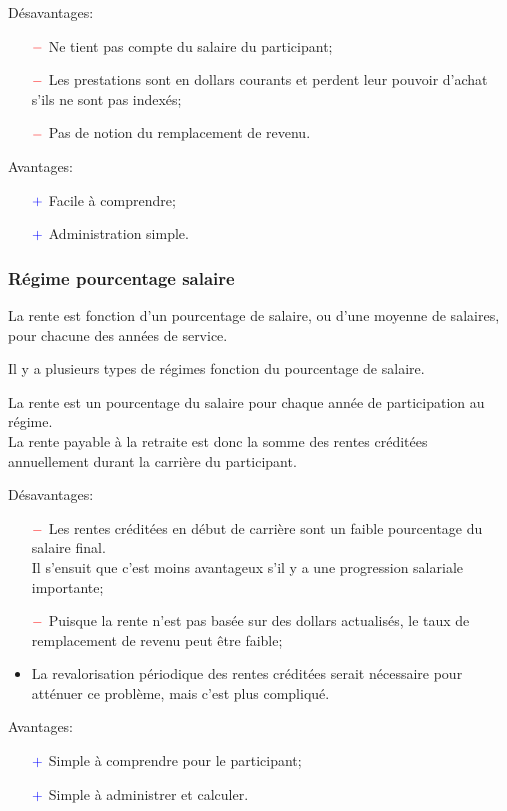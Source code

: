 \documentclass[10pt, french]{article}
\begin{document}
\begin{multicols*}{3}
\begin{definitionNOHFILL}
Désavantages:
\begin{itemize}
	\item[$\color{red}-$]	Ne tient pas compte du salaire du participant;
	\item[$\color{red}-$]	Les prestations sont en dollars courants et perdent leur pouvoir d'achat s'ils ne sont pas indexés;
	\item[$\color{red}-$]	Pas de notion du remplacement de revenu.
\end{itemize}

Avantages:
\begin{itemize}
	\item[$\color{blue}+$]	Facile à comprendre;
	\item[$\color{blue}+$]	Administration simple.
\end{itemize}
\end{definitionNOHFILL}

\subsubsection*{Régime pourcentage salaire}
La rente est fonction d'un pourcentage de salaire, ou d'une moyenne de salaires, pour chacune des années de service.

Il y a plusieurs types de régimes fonction du pourcentage de salaire.

\begin{definitionNOHFILL}
La rente est un pourcentage du salaire pour chaque année de participation au régime. \\
La rente payable à la retraite est donc la somme des rentes créditées annuellement durant la carrière du participant.

Désavantages:
\begin{itemize}
	\item[$\color{red}-$]	Les rentes créditées en début de carrière sont un faible pourcentage du salaire final.\\
							Il s'ensuit que c'est moins avantageux s'il y a une progression salariale importante;
	\item[$\color{red}-$]	Puisque la rente n'est pas basée sur des dollars actualisés, le taux de remplacement de revenu peut être faible;
	\item	La revalorisation périodique des rentes créditées serait nécessaire pour atténuer ce problème, mais c'est plus compliqué.
\end{itemize}

Avantages:
\begin{itemize}
	\item[$\color{blue}+$]	Simple à comprendre pour le participant;
	\item[$\color{blue}+$]	Simple à administrer et calculer.
\end{itemize}
\end{definitionNOHFILL}


\end{multicols*}
\end{document}
